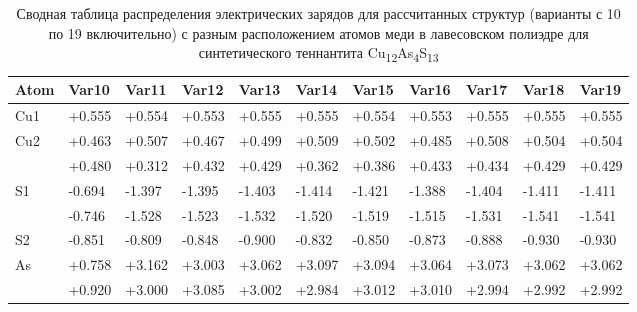 \begin{landscape}
\begin{table} [htbp]
\centering
\caption{Сводная таблица распределения электрических зарядов для рассчитанных структур (варианты с 10 по 19 включительно) с разным расположением атомов меди в лавесовском полиэдре для синтетического теннантита Cu\textsubscript{12}As\textsubscript{4}S\textsubscript{13}}%
	\label{mod_char2}%
    \renewcommand{\arraystretch}{1.5}
	\begin{tabular}{@{}@{\extracolsep{10pt}}lllllllllll@{}} 

\toprule     %
Atom                         &Var10& Var11& Var12& Var13 & Var14& Var15& Var16& Var17& Var18& Var19          \\ \hline
Cu1                           & +0.555& +0.554& +0.553 & +0.555&+0.555&+0.554& +0.553&+0.555&+0.555&+0.555\\ \hline
\multirow{2}{*}{Cu2 } & +0.463  & +0.507  & +0.467  & +0.499 & +0.509   & +0.502  & +0.485  & +0.508  & +0.504  & +0.504 \\ 
                                &+0.480 & +0.312 &  +0.432 &  +0.429 &  +0.362  &  +0.386 &  +0.433 & +0.434 &  +0.429 &  +0.429  \\ \hline
\multirow{2}{*}{S1}   & -0.694 & -1.397  & -1.395  & -1.403& -1.414 & -1.421 & -1.388& -1.404& -1.411  & -1.411  \\ 
                                & -0.746 & -1.528 & -1.523 &  -1.532 & -1.520  &-1.519 &-1.515 &-1.531 & -1.541 & -1.541  \\ \hline
S2                        & -0.851        & -0.809        & -0.848        & -0.900        & -0.832         & -0.850        & -0.873        & -0.888        & -0.930        & -0.930         \\ \hline
\multirow{2}{*}{As}   & +0.758 & +3.162 &+3.003 &+3.062 &+3.097  & +3.094 & +3.064 & +3.073 & +3.062& +3.062 \\
                               & +0.920 & +3.000 & +3.085 &+3.002 & +2.984  & +3.012 &+3.010 &+2.994 &+2.992 &+2.992  \\ \hline
 \bottomrule 


\end{tabular}
\end{table}
\end{landscape}


